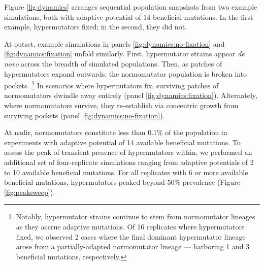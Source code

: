 

Figure \ref{fig:dynamics} arranges sequential population snapshots from two example simulations, both with adaptive potential of 14 beneficial mutations.
In the first example, hypermutators fixed; in the second, they did not.

At outset, example simulations in panels \ref{fig:dynamics:no-fixation} and \ref{fig:dynamics:fixation} unfold similarly.
First, hypermutator strains appear \textit{de novo} across the breadth of simulated populations.
Then, as patches of hypermutators expand outwards, the normomutator population is broken into pockets.%
\footnote{%
Notably, hypermutator strains continue to stem from normomutator lineages as they accrue adaptive mutations.
Of 16 replicates where hypermutators fixed, we observed 2 cases where the final dominant hypermutator lineage arose from a partially-adapted normomutator lineage --- harboring 1 and 3 beneficial mutations, respectively.
}
In scenarios where hypermutators fix, surviving patches of normomutators dwindle away entirely (panel \ref{fig:dynamics:fixation}).
Alternately, where normomutators survive, they re-establish via concentric growth from surviving pockets (panel \ref{fig:dynamics:no-fixation}).



At nadir, normomutators constitute less than 0.1\% of the population in experiments with adaptive potential of 14 available beneficial mutations.
To assess the peak of transient presence of hypermutators within, we performed an additional set of four-replicate simulations ranging from adaptive potentials of 2 to 10 available beneficial mutations.
For all replicates with 6 or more available beneficial mutations, hypermutators peaked beyond 50\% prevalence (Figure \ref{fig:peaksweep}).
